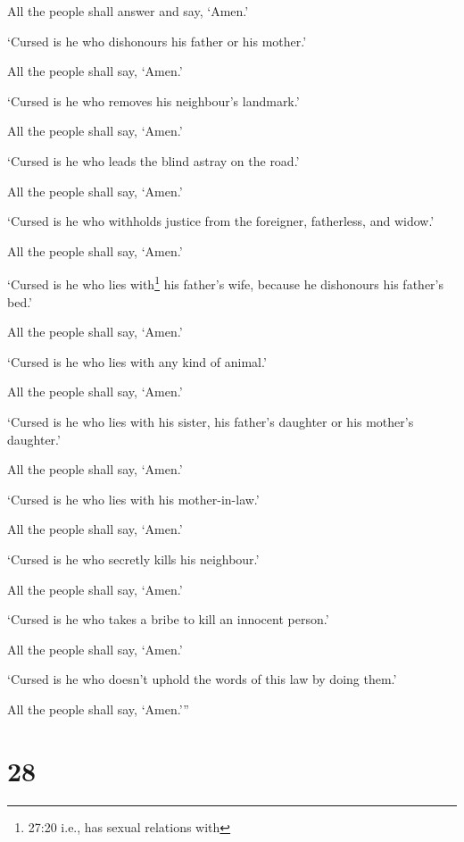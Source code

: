 All the people shall answer and say, `Amen.'

 `Cursed is he who dishonours his father or his mother.'

All the people shall say, `Amen.'

 `Cursed is he who removes his neighbour's landmark.'

All the people shall say, `Amen.'

 `Cursed is he who leads the blind astray on the road.'

All the people shall say, `Amen.'

 `Cursed is he who withholds justice from the foreigner,
fatherless, and widow.'

All the people shall say, `Amen.'

 `Cursed is he who lies with\footnote{27:20 i.e., has
  sexual relations with} his father's wife, because he dishonours his
father's bed.'

All the people shall say, `Amen.'

 `Cursed is he who lies with any kind of animal.'

All the people shall say, `Amen.'

 `Cursed is he who lies with his sister, his father's
daughter or his mother's daughter.'

All the people shall say, `Amen.'

 `Cursed is he who lies with his mother-in-law.'

All the people shall say, `Amen.'

 `Cursed is he who secretly kills his neighbour.'

All the people shall say, `Amen.'

 `Cursed is he who takes a bribe to kill an innocent
person.'

All the people shall say, `Amen.'

 `Cursed is he who doesn't uphold the words of this law by
doing them.'

All the people shall say, `Amen.'''

\hypertarget{section-27}{%
\section{28}\label{section-27}}

